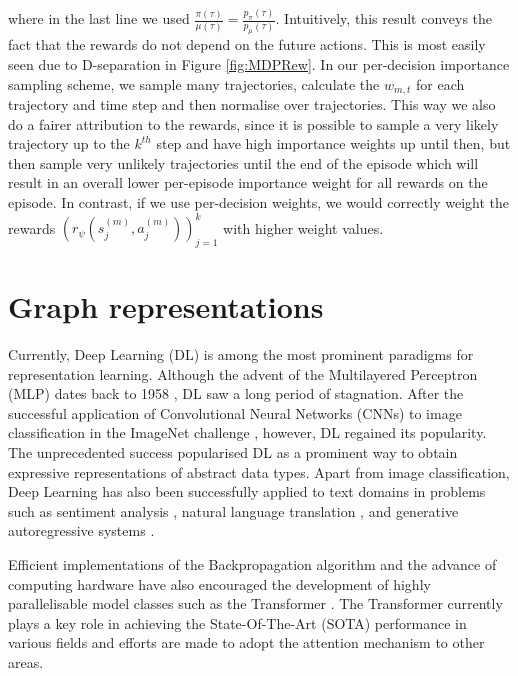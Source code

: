 \documentclass{report}
\numberwithin{equation}{section}
\numberwithin{figure}{section}
\numberwithin{table}{section}
\numberwithin{algorithm}{section}
\begin{document}
where in the last line we used $\frac{\pi(\tau)}{\mu(\tau)}=\frac{p_\pi(\tau)}{p_\mu(\tau)}$.
Intuitively, this result conveys the fact that the rewards 
do not depend on the future actions. This is most easily 
seen due to D-separation in Figure \ref{fig:MDPRew}.
In our per-decision importance sampling scheme, we sample 
many trajectories, calculate the $w_{m,t}$ for each 
trajectory and time step and then normalise over trajectories.
This way we also do a fairer attribution to the rewards, since 
it is possible to sample a very likely trajectory up to 
the $k^{th}$ step and have high importance weights up until then, 
but then sample very unlikely trajectories until the end of the episode 
which will result in an overall lower 
per-episode importance weight for all rewards on the episode. 
In contrast, if we use per-decision weights, we would 
correctly weight the rewards 
$\left(r_\psi(s_j^{(m)}, a_j^{(m)})\right)_{j=1}^k$ 
with higher weight values. 


\section{Graph representations}\label{sec:GNNs}
Currently, Deep Learning (DL) is among the most prominent paradigms 
for representation learning. Although the advent of the 
Multilayered Perceptron (MLP) dates back to 
1958 \citep{perceptron}, DL saw a long period 
of stagnation. After the successful application of 
Convolutional Neural 
Networks (CNNs) \citep{CNNsLecun} to image classification
in the ImageNet challenge 
\citep{alexnet,imagenet}, however, DL regained 
its popularity. The unprecedented success 
popularised DL as a prominent way 
to obtain expressive representations of abstract data types. 
Apart from image classification, 
Deep Learning has also been successfully 
applied to text domains in problems such as 
sentiment analysis \citep{SentimentRNN,textCNN,BERT},  
natural language translation \citep{nlpTranslation},
and generative autoregressive systems \citep{GPT,GPT2020}.

Efficient implementations \citep{PyTorch,tensorflow} 
of the Backpropagation algorithm \citep{backprop} and the 
advance of computing 
hardware have also encouraged the development of highly parallelisable 
model classes such as the Transformer \citep{transformers}. The 
Transformer currently plays a key role in achieving the 
State-Of-The-Art (SOTA) performance 
in various fields and efforts are made to adopt the attention 
mechanism to other areas.
\end{document}
